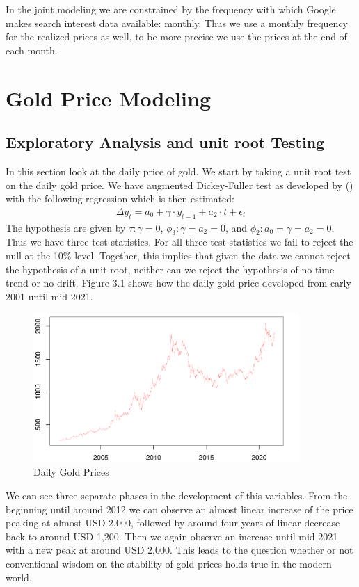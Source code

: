 \documentclass[a4paper]{article}
\theoremstyle{definition}
\begin{document}
In the joint modeling we are constrained by the frequency with which Google makes search interest data available: monthly. Thus we use a monthly frequency for the realized prices as well, to be more precise we use the prices at the end of each month. 
\newpage
\section{Gold Price Modeling}
\subsection{Exploratory Analysis and unit root Testing}
In this section look at the daily price of gold. We start by taking a unit root test on the daily gold price. We have augmented Dickey-Fuller test as developed by \citeauthor{Dickey.1979} (\citeyear{Dickey.1979}) with the following regression which is then estimated:
	\begin{align*}
	\Delta y_t = a_0 + \gamma \cdot y_{t-1} + a_2 \cdot t + \epsilon_{t}
	\end{align*}
The hypothesis are given by $\tau: \gamma = 0$, $\phi_3: \gamma = a_2 = 0$, and $\phi_2: a_0 = \gamma = a_2 = 0$. Thus we have three test-statistics. For all three test-statistics we fail to reject the null at the 10\% level. Together, this implies that given the data we cannot reject the hypothesis of a unit root, neither can we reject the hypothesis of no time trend or no drift. Figure 3.1 shows how the daily gold price developed from early 2001 until mid 2021.
	\begin{figure}[!t]
	\centering
	\caption{Daily Gold Prices}
	\includegraphics[width=0.90\textwidth]{goldPriceHF.pdf}
	\end{figure}

We can see three separate phases in the development of this variables. From the beginning until around 2012 we can observe an almost linear increase of the price peaking at almost USD 2,000, followed by around four years of linear decrease back to around USD 1,200. Then we again observe an increase until mid 2021 with a new peak at around USD 2,000. This leads to the question whether or not conventional wisdom on the stability of gold prices holds true in the modern world.
\end{document}

